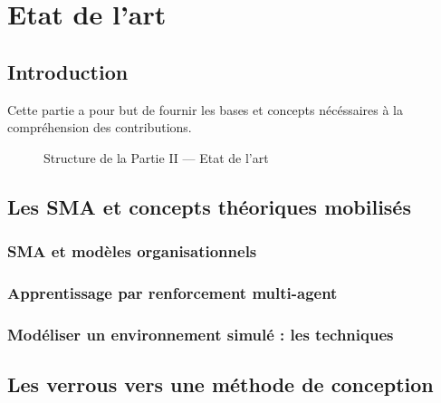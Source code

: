 \cleardoublepage
{}
\part{Etat de l'art}
\label{part:methode}

\chapter*{Introduction}
Cette partie a pour but de fournir les bases et concepts nécéssaires à la compréhension des contributions.

\begin{figure}[h!]
    \centering
    \resizebox{\textwidth}{!}{%
        
    }
    \caption{Structure de la Partie II — Etat de l'art}
\end{figure}

\chapter{Les SMA et concepts théoriques mobilisés}

\section{SMA et modèles organisationnels}

\section{Apprentissage par renforcement multi-agent}

\section{Modéliser un environnement simulé : les techniques }

\chapter{Les verrous vers une méthode de conception}

